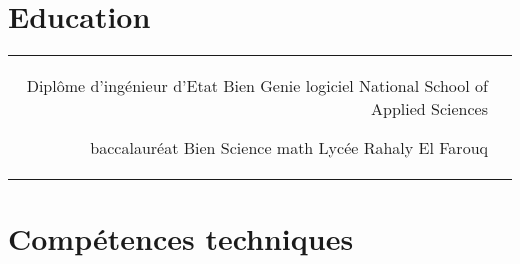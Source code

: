 \documentclass[10pt]{article} %
\begin{document}
\begin{paracol}{2}

\section{Education} 





\begin{supertabular}{rl} %

	
	
	{Diplôme d'ingénieur d'Etat} %
	{Bien} %
	{Genie logiciel} %
	{National School of Applied Sciences} %
	
	
	{baccalauréat} %
	{Bien} %
	{Science math} %
	{Lycée Rahaly El Farouq} %
	

\end{supertabular}



\section{Compétences techniques} 



\end{paracol}
\end{document}
